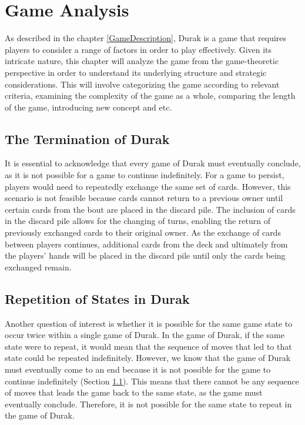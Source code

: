 \chapter{Game Analysis}

As described in the chapter \ref{GameDescription}, Durak is a game that requires players to consider a range of factors in order to play effectively. Given its intricate nature, this chapter will analyze the game from the game-theoretic perspective in order to understand its underlying structure and strategic considerations. This will involve categorizing the game according to relevant criteria, examining the complexity of the game as a whole, comparing the length of the game, introducing new concept and etc.

\section{The Termination of Durak}
\label{termination}
It is essential to acknowledge that every game of Durak must eventually conclude, as it is not possible for a game to continue indefinitely. For a game to persist, players would need to repeatedly exchange the same set of cards. However, this scenario is not feasible because cards cannot return to a previous owner until certain cards from the bout are placed in the discard pile. The inclusion of cards in the discard pile allows for the changing of turns, enabling the return of previously exchanged cards to their original owner. As the exchange of cards between players continues, additional cards from the deck and ultimately from the players' hands will be placed in the discard pile until only the cards being exchanged remain.

\section{Repetition of States in Durak}
Another question of interest is whether it is possible for the same game state to occur twice within a single game of Durak. In the game of Durak, if the same state were to repeat, it would mean that the sequence of moves that led to that state could be repeated indefinitely. However, we know that the game of Durak must eventually come to an end because it is not possible for the game to continue indefinitely (Section \ref{termination}). This means that there cannot be any sequence of moves that leads the game back to the same state, as the game must eventually conclude. Therefore, it is not possible for the same state to repeat in the game of Durak.

